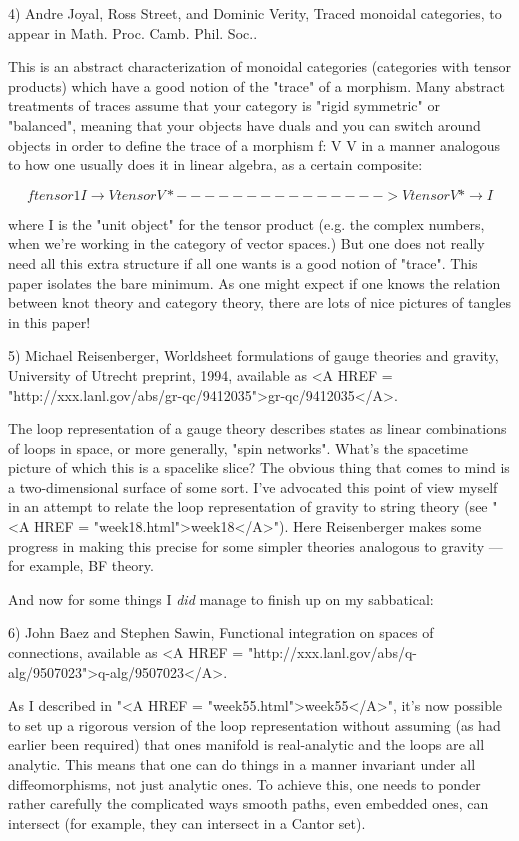 4) Andre Joyal, Ross Street, and Dominic Verity, Traced monoidal categories,
to appear in Math. Proc. Camb. Phil. Soc..

This is an abstract characterization of monoidal categories (categories
with tensor products) which have a good notion of the "trace" of a morphism.
Many abstract treatments of traces assume that your category is "rigid 
symmetric" or "balanced", meaning that your objects have duals and you can 
switch around objects in order to define the trace of a 
morphism f: V \to  V in a manner analogous to how one usually does it in 
linear algebra, as a certain composite:

$$
                                  f tensor 1
               I \to  V tensor V* ---------------> V tensor V* \to  I
$$
    

where I is the "unit object" for the tensor product (e.g. the 
complex numbers, when we're working in the category of vector
spaces.)  But one does not really need all this extra structure 
if all one wants is a good notion of "trace".  This paper isolates
the bare minimum.  As one might expect if one knows the relation
between knot theory and category theory, there are lots of
nice pictures of tangles in this paper!


5)  Michael Reisenberger, Worldsheet formulations of gauge theories
and gravity, University of Utrecht preprint, 1994, available as 
<A HREF = "http://xxx.lanl.gov/abs/gr-qc/9412035">gr-qc/9412035</A>.

The loop representation of a gauge theory describes states as linear
combinations of loops in space, or more generally, "spin networks".  
What's the spacetime picture of which this is a spacelike slice?  The
obvious thing that comes to mind is a two-dimensional surface of some
sort.  I've advocated this point of view myself in an attempt to relate
the loop representation of gravity to string theory (see "<A HREF = "week18.html">week18</A>").  Here
Reisenberger makes some progress in making this precise for some
simpler theories analogous to gravity --- for example, BF theory.  

And now for some things I \emph{did} manage to finish up on my sabbatical:


6)  John Baez and Stephen Sawin, Functional integration on spaces
of connections, available as <A HREF = "http://xxx.lanl.gov/abs/q-alg/9507023">q-alg/9507023</A>.

As I described in "<A HREF = "week55.html">week55</A>", it's now possible to set up a rigorous
version of the loop representation without assuming (as had earlier
been required) that ones manifold is real-analytic and the loops are 
all analytic.  This means that one can do things in a manner invariant
under all diffeomorphisms, not just analytic ones.  To achieve this,
one needs to ponder rather carefully the complicated ways smooth
paths, even embedded ones, can intersect (for example, they can intersect
in a Cantor set).   


